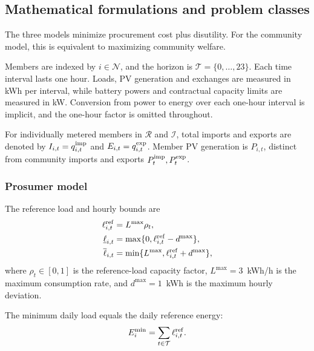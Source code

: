 \subsection{Mathematical formulations and problem classes}
\label{sec:q1-formulations}

\par
\begingroup
\setlength{\parindent}{0pt}
\setlength{\parskip}{0.5em}

The three models minimize procurement cost plus disutility.
For the community model, this is equivalent to maximizing
community welfare.

Members are indexed by $i\in\mathcal N$, and the horizon
is $\mathcal T=\{0,\ldots,23\}$.
Each time interval lasts one hour.
Loads, PV generation and exchanges are measured in kWh
per interval, while battery powers and contractual
capacity limits are measured in kW.
Conversion from power to energy over each one-hour
interval is implicit, and the one-hour factor is
omitted throughout.

For individually metered members in $\mathcal R$ and $\mathcal I$,
total imports and exports are denoted by
$I_{i,t}=q^{\rm imp}_{i,t}$ and
$E_{i,t}=q^{\rm exp}_{i,t}$.
Member PV generation is $P_{i,t}$, distinct from
community imports and exports
$P_t^{\rm imp},P_t^{\rm exp}$.


\subsubsection{Prosumer model}

The reference load and hourly bounds are
\begin{align}
\ell^{\rm ref}_{i,t}
&=L^{\max}\rho_t,
\label{eq:q1-reference-load}\\
\underline\ell_{i,t}
&=\max\{0,\ell^{\rm ref}_{i,t}-d^{\max}\},
\label{eq:q1-load-lower}\\
\overline\ell_{i,t}
&=\min\{L^{\max},
         \ell^{\rm ref}_{i,t}+d^{\max}\},
\label{eq:q1-load-upper}
\end{align}
where $\rho_t\in[0,1]$ is the reference-load
capacity factor, $L^{\max}=3$~kWh/h is the maximum
consumption rate, and $d^{\max}=1$~kWh is the
maximum hourly deviation.

The minimum daily load equals the daily reference
energy:
\begin{equation}
E_i^{\min}
=\sum_{t\in\mathcal T}\ell^{\rm ref}_{i,t}.
\label{eq:q1-daily-minimum-parameter}
\end{equation}

